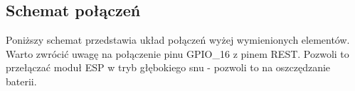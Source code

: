\subsection{Schemat połączeń}

Poniższy schemat przedstawia układ połączeń wyżej wymienionych elementów. Warto zwrócić uwagę na połączenie pinu GPIO\_16 z pinem REST. Pozwoli to przełączać moduł ESP w tryb głębokiego snu - pozwoli to na oszczędzanie baterii.

\begin{center}
\end{center}

